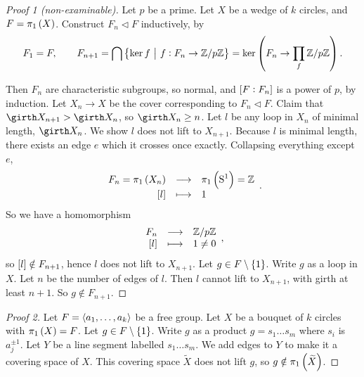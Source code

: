 \begin{proof}[Proof 1 (non-examinable)]
Let $ p $ be a prime. Let $ X $ be a wedge of $ k $ circles, and $ F = \pi_1\br{X} $. Construct $ F_n \triangleleft F $ inductively, by
$$ F_1 = F, \qquad F_{n + 1} = \bigcap \cbr{\ker f \st f : F_n \to \ZZ / p\ZZ} = \ker \br{F_n \to \prod_f \ZZ / p\ZZ}. $$

\pagebreak

Then $ F_n $ are characteristic subgroups, so normal, and $ \sbr{F : F_n} $ is a power of $ p $, by induction. Let $ X_n \to X $ be the cover corresponding to $ F_n \triangleleft F $. Claim that $ \girth X_{n + 1} > \girth X_n $, so $ \girth X_n \ge n $. Let $ l $ be any loop in $ X_n $ of minimal length, $ \girth X_n $. We show $ l $ does not lift to $ X_{n + 1} $. Because $ l $ is minimal length, there exists an edge $ e $ which it crosses once exactly. Collapsing everything except $ e $,
$$ \function{F_n = \pi_1\br{X_n}}{\pi_1\br{\S^1} = \ZZ}{\sbr{l}}{1}. $$
So we have a homomorphism
$$ \function{F_n}{\ZZ / p\ZZ}{\sbr{l}}{1 \ne 0}, $$
so $ \sbr{l} \notin F_{n + 1} $, hence $ l $ does not lift to $ X_{n + 1} $. Let $ g \in F \setminus \cbr{1} $. Write $ g $ as a loop in $ X $. Let $ n $ be the number of edges of $ l $. Then $ l $ cannot lift to $ X_{n + 1} $, with girth at least $ n + 1 $. So $ g \notin F_{n + 1} $.
\end{proof}

\begin{proof}[Proof 2]
Let $ F = \left\langle a_1, \dots, a_k \right\rangle $ be a free group. Let $ X $ be a bouquet of $ k $ circles with $ \pi_1\br{X} = F $. Let $ g \in F \setminus \cbr{1} $. Write $ g $ as a product $ g = s_1 \dots s_m $ where $ s_i $ is $ a_j^{\pm 1} $. Let $ Y $ be a line segment labelled $ s_1 \dots s_m $. We add edges to $ Y $ to make it a covering space of $ X $. This covering space $ \widetilde{X} $ does not lift $ g $, so $ g \notin \pi_1\br{\widetilde{X}} $.
\end{proof}


